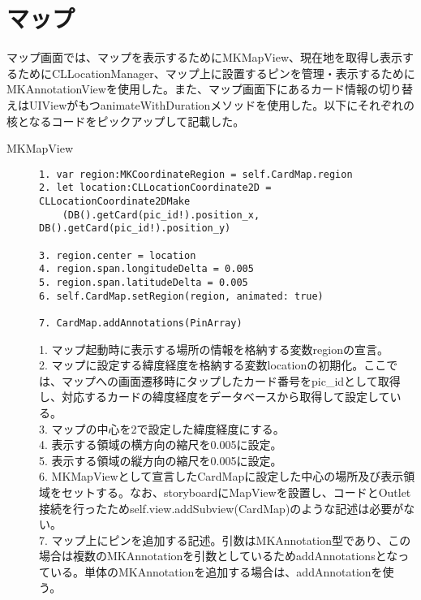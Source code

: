 \section{マップ}
マップ画面では、マップを表示するためにMKMapView、現在地を取得し表示するためにCLLocationManager、マップ上に設置するピンを管理・表示するためにMKAnnotationViewを使用した。また、マップ画面下にあるカード情報の切り替えはUIViewがもつanimateWithDurationメソッドを使用した。以下にそれぞれの核となるコードをピックアップして記載した。

\begin{description}
\item[MKMapView]\mbox{} 
\begin{lstlisting}[basicstyle=\ttfamily\footnotesize, frame=single]
1. var region:MKCoordinateRegion = self.CardMap.region
2. let location:CLLocationCoordinate2D = CLLocationCoordinate2DMake
    (DB().getCard(pic_id!).position_x, DB().getCard(pic_id!).position_y)

3. region.center = location
4. region.span.longitudeDelta = 0.005
5. region.span.latitudeDelta = 0.005
6. self.CardMap.setRegion(region, animated: true)

7. CardMap.addAnnotations(PinArray)
 \end{lstlisting}

1. マップ起動時に表示する場所の情報を格納する変数regionの宣言。 \\
2. マップに設定する緯度経度を格納する変数locationの初期化。ここでは、マップへの画面遷移時にタップしたカード番号をpic\_idとして取得し、対応するカードの緯度経度をデータベースから取得して設定している。\\
3. マップの中心を2で設定した緯度経度にする。\\
4. 表示する領域の横方向の縮尺を0.005に設定。 \\
5. 表示する領域の縦方向の縮尺を0.005に設定。 \\
6. MKMapViewとして宣言したCardMapに設定した中心の場所及び表示領域をセットする。なお、storyboardにMapViewを設置し、コードとOutlet接続を行ったためself.view.addSubview(CardMap)のような記述は必要がない。\\
7. マップ上にピンを追加する記述。引数はMKAnnotation型であり、この場合は複数のMKAnnotationを引数としているためaddAnnotationsとなっている。単体のMKAnnotationを追加する場合は、addAnnotationを使う。 \\
\end{description}

